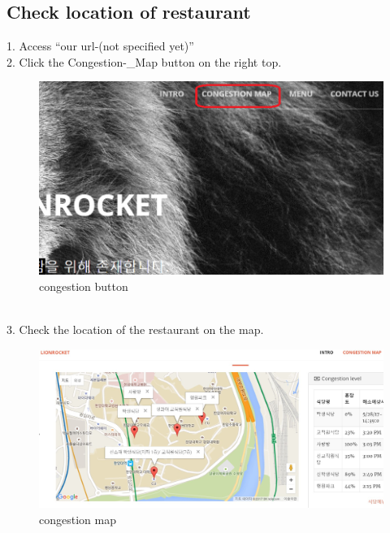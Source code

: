 \documentclass[journal]{IEEEtran}
\begin{document}
\subsection{Check location of restaurant}
1. Access “our url-(not specified yet)” \\
2. Click the Congestion-\_Map button on the right top. 
\begin{figure}[h]
\centering
\includegraphics[scale=0.5]{congestion.png}
\caption{congestion button}
\label{fig:congestion button}
\end{figure}
\newline
\newline
\newline
\newline
\newline
\\3. Check the location of the restaurant on the map.

\begin{figure}[h]
\centering
\includegraphics[scale=0.17]{B.jpg}
\caption{congestion map}
\label{fig:congestion button}
\end{figure}



\end{document}
